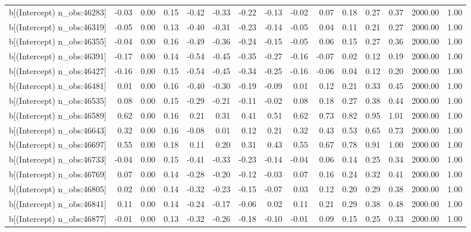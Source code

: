 \begin{table}[ht]
\begin{tabular}{rrrrrrrrrrrrrrr}
  b[(Intercept) n\_obs:46283] & -0.03 & 0.00 & 0.15 & -0.42 & -0.33 & -0.22 & -0.13 & -0.02 & 0.07 & 0.18 & 0.27 & 0.37 & 2000.00 & 1.00 \\ 
  b[(Intercept) n\_obs:46319] & -0.05 & 0.00 & 0.13 & -0.40 & -0.31 & -0.23 & -0.14 & -0.05 & 0.04 & 0.11 & 0.21 & 0.27 & 2000.00 & 1.00 \\ 
  b[(Intercept) n\_obs:46355] & -0.04 & 0.00 & 0.16 & -0.49 & -0.36 & -0.24 & -0.15 & -0.05 & 0.06 & 0.15 & 0.27 & 0.36 & 2000.00 & 1.00 \\ 
  b[(Intercept) n\_obs:46391] & -0.17 & 0.00 & 0.14 & -0.54 & -0.45 & -0.35 & -0.27 & -0.16 & -0.07 & 0.02 & 0.12 & 0.19 & 2000.00 & 1.00 \\ 
  b[(Intercept) n\_obs:46427] & -0.16 & 0.00 & 0.15 & -0.54 & -0.45 & -0.34 & -0.25 & -0.16 & -0.06 & 0.04 & 0.12 & 0.20 & 2000.00 & 1.00 \\ 
  b[(Intercept) n\_obs:46481] & 0.01 & 0.00 & 0.16 & -0.40 & -0.30 & -0.19 & -0.09 & 0.01 & 0.12 & 0.21 & 0.33 & 0.45 & 2000.00 & 1.00 \\ 
  b[(Intercept) n\_obs:46535] & 0.08 & 0.00 & 0.15 & -0.29 & -0.21 & -0.11 & -0.02 & 0.08 & 0.18 & 0.27 & 0.38 & 0.44 & 2000.00 & 1.00 \\ 
  b[(Intercept) n\_obs:46589] & 0.62 & 0.00 & 0.16 & 0.21 & 0.31 & 0.41 & 0.51 & 0.62 & 0.73 & 0.82 & 0.95 & 1.01 & 2000.00 & 1.00 \\ 
  b[(Intercept) n\_obs:46643] & 0.32 & 0.00 & 0.16 & -0.08 & 0.01 & 0.12 & 0.21 & 0.32 & 0.43 & 0.53 & 0.65 & 0.73 & 2000.00 & 1.00 \\ 
  b[(Intercept) n\_obs:46697] & 0.55 & 0.00 & 0.18 & 0.11 & 0.20 & 0.31 & 0.43 & 0.55 & 0.67 & 0.78 & 0.91 & 1.00 & 2000.00 & 1.00 \\ 
  b[(Intercept) n\_obs:46733] & -0.04 & 0.00 & 0.15 & -0.41 & -0.33 & -0.23 & -0.14 & -0.04 & 0.06 & 0.14 & 0.25 & 0.34 & 2000.00 & 1.00 \\ 
  b[(Intercept) n\_obs:46769] & 0.07 & 0.00 & 0.14 & -0.28 & -0.20 & -0.12 & -0.03 & 0.07 & 0.16 & 0.24 & 0.32 & 0.41 & 2000.00 & 1.00 \\ 
  b[(Intercept) n\_obs:46805] & 0.02 & 0.00 & 0.14 & -0.32 & -0.23 & -0.15 & -0.07 & 0.03 & 0.12 & 0.20 & 0.29 & 0.38 & 2000.00 & 1.00 \\ 
  b[(Intercept) n\_obs:46841] & 0.11 & 0.00 & 0.14 & -0.24 & -0.17 & -0.06 & 0.02 & 0.11 & 0.21 & 0.29 & 0.38 & 0.48 & 2000.00 & 1.00 \\ 
  b[(Intercept) n\_obs:46877] & -0.01 & 0.00 & 0.13 & -0.32 & -0.26 & -0.18 & -0.10 & -0.01 & 0.09 & 0.15 & 0.25 & 0.33 & 2000.00 & 1.00 \\ 

\end{tabular}
\end{table}
